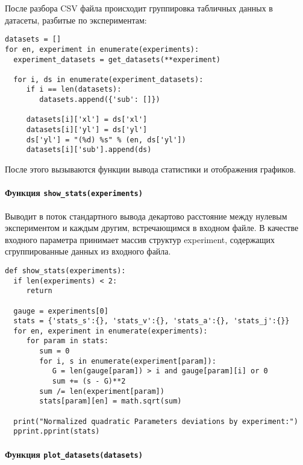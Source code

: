 После разбора CSV файла происходит группировка табличных данных в датасеты, разбитые по экспериментам:

\begin{lstlisting}[style=pythonstyle,caption={  }, label=lst:func:1]
datasets = []
for en, experiment in enumerate(experiments):
  experiment_datasets = get_datasets(**experiment)

  for i, ds in enumerate(experiment_datasets):
     if i == len(datasets):
        datasets.append({'sub': []})

     datasets[i]['xl'] = ds['xl']
     datasets[i]['yl'] = ds['yl']
     ds['yl'] = "(%d) %s" % (en, ds['yl'])
     datasets[i]['sub'].append(ds)
\end{lstlisting}

После этого вызываются функции вывода статистики и отображения графиков.

\paragraph{Функция \lstinline!show_stats(experiments)!}

Выводит в поток стандартного вывода декартово расстояние между нулевым экспериментом и каждым другим, встречающимся в входном файле. В качестве входного параметра принимает массив структур experiment, содержащих сгруппированные данных из входного файла.

\begin{lstlisting}[style=pythonstyle,caption={  }, label=lst:func:1]
  def show_stats(experiments):
  if len(experiments) < 2:
     return

  gauge = experiments[0]
  stats = {'stats_s':{}, 'stats_v':{}, 'stats_a':{}, 'stats_j':{}}
  for en, experiment in enumerate(experiments):
     for param in stats:
        sum = 0
        for i, s in enumerate(experiment[param]):
           G = len(gauge[param]) > i and gauge[param][i] or 0
           sum += (s - G)**2
        sum /= len(experiment[param])
        stats[param][en] = math.sqrt(sum)

  print("Normalized quadratic Parameters deviations by experiment:")
  pprint.pprint(stats)
\end{lstlisting}



\paragraph{Функция \lstinline!plot_datasets(datasets)!}

